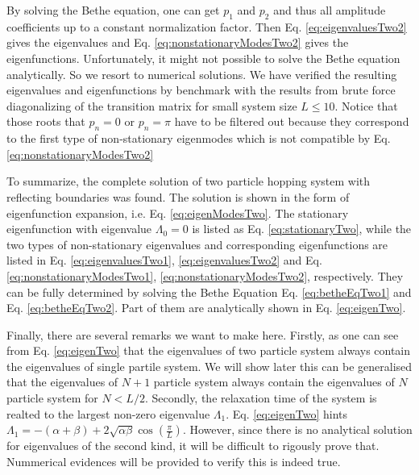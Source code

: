 By solving the Bethe equation, one can get $p_1$ and $p_2$ and thus all
amplitude coefficients up to a constant normalization factor. Then Eq.
\eqref{eq:eigenvaluesTwo2} gives the eigenvalues and Eq.
\eqref{eq:nonstationaryModesTwo2} gives the eigenfunctions.
Unfortunately, it might not possible to solve the Bethe equation analytically.
So we resort to numerical solutions. We have verified the resulting eigenvalues
and eigenfunctions by benchmark with the results from brute force diagonalizing
of the transition matrix for small system size $L\le10$. Notice that those roots
that $p_n=0$ or $p_n=\pi$ have to be filtered out because they correspond to the
first type of non-stationary eigenmodes which is not compatible by Eq.
\eqref{eq:nonstationaryModesTwo2}


To summarize, the complete solution of two particle hopping system with
reflecting boundaries was found. The solution is shown in the form of
eigenfunction expansion, i.e. Eq. \eqref{eq:eigenModesTwo}. The stationary
eigenfunction with eigenvalue $\Lambda_0=0$ is listed as Eq.
\eqref{eq:stationaryTwo}, while the two types of non-stationary eigenvalues and
corresponding eigenfunctions are listed in Eq. \eqref{eq:eigenvaluesTwo1},
\eqref{eq:eigenvaluesTwo2} and Eq.
\eqref{eq:nonstationaryModesTwo1}, \eqref{eq:nonstationaryModesTwo2},
respectively. They can be fully determined by  solving the Bethe Equation Eq.
\eqref{eq:betheEqTwo1} and Eq. \eqref{eq:betheEqTwo2}. Part of them are
analytically shown in Eq. \eqref{eq:eigenTwo}.

Finally, there are several remarks we want to make here.
Firstly, as one can see from Eq.  \eqref{eq:eigenTwo} that the eigenvalues of two
particle system always contain the eigenvalues of single partile system. We will
show later this can be generalised that the eigenvalues of $N+1$ particle system
always contain the eigenvalues of $N$ particle system for $N<L/2$. Secondly, the
relaxation time of the system is realted to the largest non-zero eigenvalue
$\Lambda_1$. Eq.  \eqref{eq:eigenTwo} hints
$\Lambda_1=-(\alpha+\beta)+2\sqrt{\alpha\beta} \cos\left(\frac{\pi}{L}\right)$.
However, since there is no analytical solution for eigenvalues of the second
kind, it will be difficult to rigously prove that. Nummerical evidences will be
provided to verify this is indeed true.


